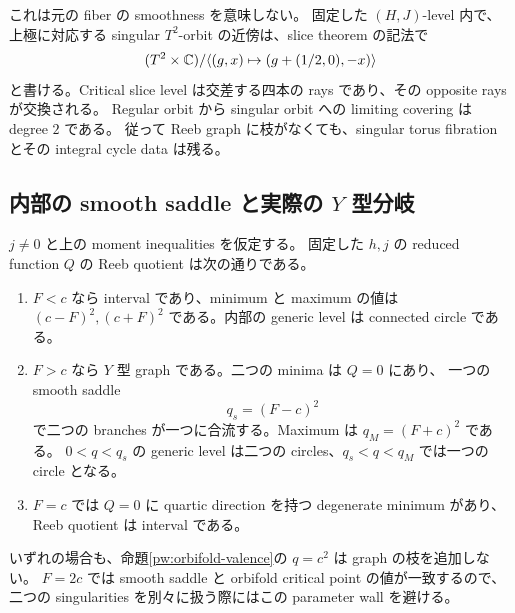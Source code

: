 これは元の fiber の smoothness を意味しない。
固定した $(H,J)$-level 内で、上極に対応する singular $T^2$-orbit の近傍は、slice theorem の記法で
\[
 (T^2\times\mathbb C)/\langle(g,x)\mapsto(g+(1/2,0),-x)\rangle
\]
と書ける。Critical slice level は交差する四本の rays であり、その opposite rays が交換される。
Regular orbit から singular orbit への limiting covering は degree $2$ である。
従って Reeb graph に枝がなくても、singular torus fibration とその integral cycle data は残る。

\subsection{内部の smooth saddle と実際の $Y$ 型分岐}

\begin{theorem}
\label{pw:reeb}
$j\ne0$ と上の moment inequalities を仮定する。
固定した $h,j$ の reduced function $Q$ の Reeb quotient は次の通りである。
\begin{enumerate}
\item $F<c$ なら interval であり、minimum と maximum の値は
 $(c-F)^2,(c+F)^2$ である。内部の generic level は connected circle である。
\item $F>c$ なら $Y$ 型 graph である。二つの minima は $Q=0$ にあり、
 一つの smooth saddle
 \begin{equation}\label{pw:saddle-value}
 q_s=(F-c)^2
 \end{equation}
 で二つの branches が一つに合流する。Maximum は $q_M=(F+c)^2$ である。
 $0<q<q_s$ の generic level は二つの circles、$q_s<q<q_M$ では一つの circle となる。
\item $F=c$ では $Q=0$ に quartic direction を持つ degenerate minimum があり、
 Reeb quotient は interval である。
\end{enumerate}
いずれの場合も、命題\ref{pw:orbifold-valence}の $q=c^2$ は graph の枝を追加しない。
$F=2c$ では smooth saddle と orbifold critical point の値が一致するので、
二つの singularities を別々に扱う際にはこの parameter wall を避ける。
\end{theorem}

